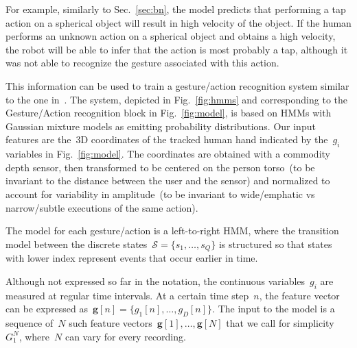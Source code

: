 For example, similarly to Sec.~\ref{sec:bn}, the \AffWords{} model predicts that performing a tap action on a spherical object will result in high velocity of the object.
If the human performs an unknown action on a spherical object and obtains a high velocity, the robot will be able to infer that the action is most probably a tap, although it was not able to recognize the gesture associated with this action.

This information can be used to train a gesture/action recognition system similar to the one in~\cite{saponaro:2013:crhri}.
The system, depicted in Fig.~\ref{fig:hmms} and corresponding to the Gesture/Action recognition block in Fig.~\ref{fig:model}, is based on \acp{HMM} with Gaussian mixture models as emitting probability distributions.
Our input features are the~3D coordinates of the tracked human hand indicated by the~$g_i$ variables in Fig.~\ref{fig:model}.
The coordinates are obtained with a commodity depth sensor, then transformed to be centered on the person torso~(to be invariant to the distance between the user and the sensor) and normalized to account for variability in amplitude~(to be invariant to wide/emphatic vs narrow/subtle executions of the same action).

The model for each gesture/action is a
left-to-right \ac{HMM}, where the transition model between the discrete states~$\mathcal{S} = \{s_1, \dots, s_Q\}$ is structured so that states with lower index represent events that occur earlier in time.

Although not expressed so far in the notation, the continuous variables~$g_i$ are measured at regular time intervals.
At a certain time step~$n$, the feature vector can be expressed as~$\bm{g}[n] = \{g_1[n], \dots, g_D[n]\}$.
The input to the model is a sequence of~$N$ such feature vectors~$\bm{g}[1], \dots, \bm{g}[N]$ that we call for simplicity~$G_1^N$, where~$N$ can vary for every recording.

